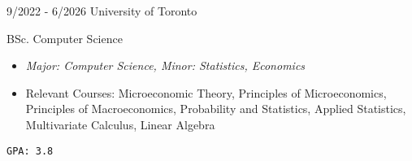 \documentclass[9pt]{developercv} %
\begin{document}
\vspace{-10 pt}
\begin{entrylist}
    \entry
		{9/2022 - 6/2026}
		{University of Toronto}
		{}
		{BSc. Computer Science
        \vspace{5pt}
        \begin{itemize}[itemsep=3pt,topsep=0pt,parsep=0pt,partopsep=0pt, leftmargin=-1pt]
            \item \textit{Major: Computer Science, Minor: Statistics, Economics}
            \item Relevant Courses: Microeconomic Theory, Principles of Microeconomics, Principles of Macroeconomics, Probability and Statistics, Applied Statistics, Multivariate Calculus, Linear Algebra
        \end{itemize}
        \vspace{5pt}
        \texttt{GPA: 3.8}
        }
\end{entrylist}
\end{document}
